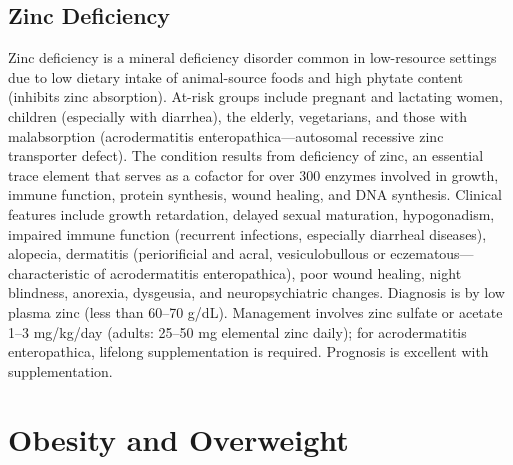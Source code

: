 \subsection{Zinc Deficiency}
\label{sec:Zinc Deficiency}
Zinc deficiency is a mineral deficiency disorder common in low-resource settings due to low dietary intake of animal-source foods and high phytate content (inhibits zinc absorption). At-risk groups include pregnant and lactating women, children (especially with diarrhea), the elderly, vegetarians, and those with malabsorption (acrodermatitis enteropathica---autosomal recessive zinc transporter defect). The condition results from deficiency of zinc, an essential trace element that serves as a cofactor for over 300 enzymes involved in growth, immune function, protein synthesis, wound healing, and DNA synthesis. Clinical features include growth retardation, delayed sexual maturation, hypogonadism, impaired immune function (recurrent infections, especially diarrheal diseases), alopecia, dermatitis (periorificial and acral, vesiculobullous or eczematous---characteristic of acrodermatitis enteropathica), poor wound healing, night blindness, anorexia, dysgeusia, and neuropsychiatric changes. Diagnosis is by low plasma zinc (less than 60--70 \textmu g/dL). Management involves zinc sulfate or acetate 1--3 mg/kg/day (adults: 25--50 mg elemental zinc daily); for acrodermatitis enteropathica, lifelong supplementation is required. Prognosis is excellent with supplementation.

\section{Obesity and Overweight}








